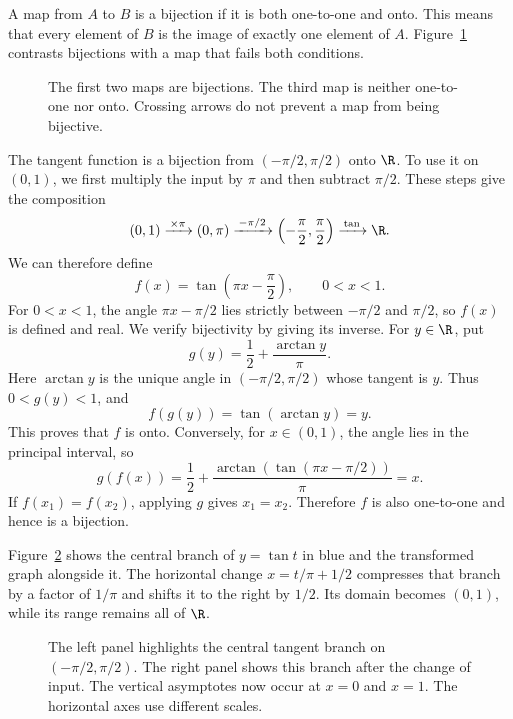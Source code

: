 A map from $A$ to $B$ is a bijection if it is both one-to-one
and onto. This means that every element of $B$ is the image of
exactly one element of $A$.
Figure~\ref{fig:hw01:bijections} contrasts bijections with a map
that fails both conditions.

\begin{figure}[h]
  \centering
  
  \caption{The first two maps are bijections. The third map is neither
    one-to-one nor onto. Crossing arrows do not prevent a map from
    being bijective.}
  \label{fig:hw01:bijections}
\end{figure}

The tangent function is a bijection from
$(-\pi/2,\pi/2)$ onto $\R$. To use it on $(0,1)$, we first
multiply the input by $\pi$ and then subtract $\pi/2$.
These steps give the composition
\[
  (0,1)\xrightarrow{\,\times\pi\,}(0,\pi)
    \xrightarrow{\,-\pi/2\,}
    \left(-\frac\pi2,\frac\pi2\right)
    \xrightarrow{\,\tan\,}\R.
\]
We can therefore define
\[
  f(x)=\tan\left(\pi x-\frac\pi2\right),
    \qquad 0<x<1.
\]
For $0<x<1$, the angle $\pi x-\pi/2$ lies strictly between
$-\pi/2$ and $\pi/2$, so $f(x)$ is defined and real.
We verify bijectivity by giving its inverse. For $y\in\R$, put
\[
  g(y)=\frac12+\frac{\arctan y}{\pi}.
\]
Here $\arctan y$ is the unique angle in $(-\pi/2,\pi/2)$
whose tangent is $y$. Thus $0<g(y)<1$, and
\[
  f(g(y))=\tan(\arctan y)=y.
\]
This proves that $f$ is onto. Conversely, for $x\in(0,1)$,
the angle lies in the principal interval, so
\[
  g(f(x))=\frac12+
    \frac{\arctan(\tan(\pi x-\pi/2))}{\pi}=x.
\]
If $f(x_1)=f(x_2)$, applying $g$ gives $x_1=x_2$.
Therefore $f$ is also one-to-one and hence is a bijection.
\clearpage

Figure~\ref{fig:hw01:tangent-overview} shows the central branch of
$y=\tan t$ in blue and the transformed graph alongside it.
The horizontal change $x=t/\pi+1/2$ compresses that branch by a
factor of $1/\pi$ and shifts it to the right by $1/2$.
Its domain becomes $(0,1)$, while its range remains all of $\R$.

\begin{figure}[h]
  \centering
  
  \caption{The left panel highlights the central tangent branch on
    $(-\pi/2,\pi/2)$. The right panel shows this branch after the
    change of input. The vertical asymptotes now occur at $x=0$
    and $x=1$. The horizontal axes use different scales.}
  \label{fig:hw01:tangent-overview}
\end{figure}
